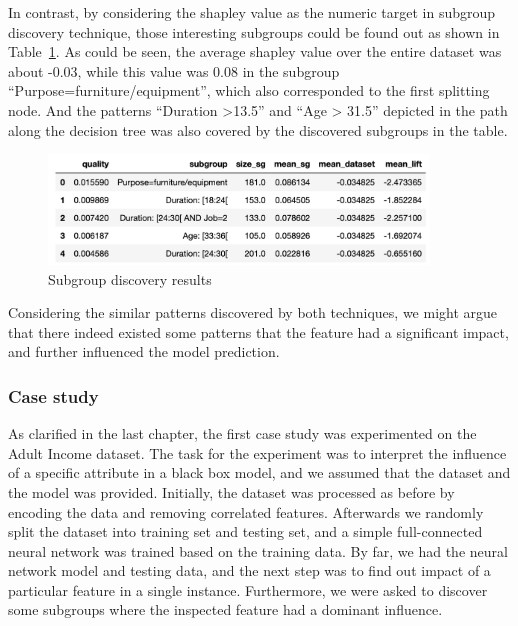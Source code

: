 In contrast, by considering the shapley value as the numeric target in subgroup discovery technique, those interesting subgroups could be found out as shown in Table~\ref{fig:credit_subgroup}. As could be seen, the average shapley value over the entire dataset was about -0.03, while this value was 0.08 in the subgroup “Purpose=furniture/equipment”, which also corresponded to the first splitting node. And the patterns “Duration >13.5” and “Age > 31.5” depicted in the path along the decision tree was also covered by the discovered subgroups in the table. 

\begin{figure}[H]
	\includegraphics[width=0.9\textwidth]{imgs/credit_subgroup.png}
	\caption{Subgroup discovery results}
	\label{fig:credit_subgroup}
\end{figure}

Considering the similar patterns discovered by both techniques, we might argue that there indeed existed some patterns that the feature had a significant impact, and further influenced the model prediction.

\subsubsection{Case study} 
As clarified in the last chapter, the first case study was experimented on the Adult Income dataset. The task for the experiment was to interpret the influence of a specific attribute in a black box model, and we assumed that the dataset and the model was provided. Initially, the dataset was processed as before by encoding the data and removing correlated features. Afterwards we randomly split the dataset into training set and testing set, and a simple full-connected neural network was trained based on the training data. By far, we had the neural network model and testing data, and the next step was to find out impact of a particular feature in a single instance. Furthermore, we were asked to discover some subgroups where the inspected feature had a dominant influence. 

